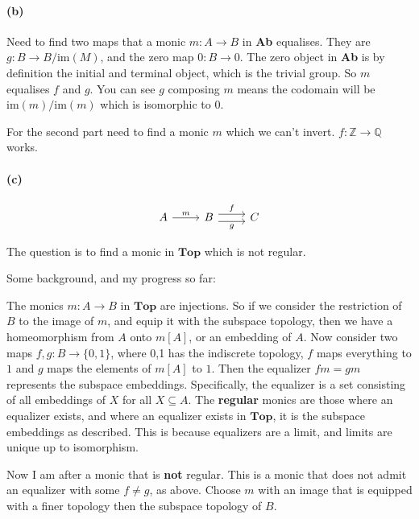 \documentclass{article}
\begin{document}
\paragraph{(b)}

Need to find two maps that a monic $m\colon A \rightarrow B$ in \textbf{Ab} equalises. They are $g: B \rightarrow B/\text{im}(M)$, and the zero map $0: B \rightarrow 0$. The zero object in \textbf{Ab} is by definition the initial and terminal object, which is the trivial group. So $m$ equalises $f$ and $g$. You can see $g$ composing $m$ means the codomain will be $\text{im}(m)/\text{im}(m)$ which is isomorphic to $0$.

For the second part need to find a monic $m$ which we can't invert. $f:\mathds{Z} \rightarrow \mathds{Q}$ works.

\paragraph{(c)}

\begin{equation*}
\label{eqn5143}
\begin{tikzcd}
 A \ar[r, "m"] &
 B \ar[r,shift left=.75ex,"f"]
   \ar[r,shift right=.75ex,swap,"g"] & C
\end{tikzcd}
\end{equation*}

The question is to find a monic in $\mathbf{Top}$ which is not regular.

Some background, and my progress so far:

The monics $m: A \rightarrow B$ in $\mathbf{Top}$ are injections. So if we consider the restriction of $B$ to the image of $m$, and equip it with the subspace topology, then we have a homeomorphism from $A$ onto $m[A]$, or an embedding of $A$.   Now consider two maps $f,g: B \rightarrow \{0,1\}$, where {0,1} has the indiscrete topology, $f$ maps everything to $1$ and $g$ maps the elements of $m[A]$ to $1$. Then the equalizer $fm=gm$ represents the subspace embeddings. Specifically, the equalizer is a set consisting of all embeddings of $X$ for all $X \subseteq A$. The \textbf{regular} monics are those where an equalizer exists, and where an equalizer exists in $\mathbf{Top}$, it is the subspace embeddings as described. This is because equalizers are a limit, and limits are unique up to isomorphism.

Now I am after a monic that is \textbf{not} regular. This is a monic that does not admit an equalizer with some $f \neq g$, as above. Choose $m$ with an image that is equipped with a finer topology then the subspace topology of $B$.
\end{document}
